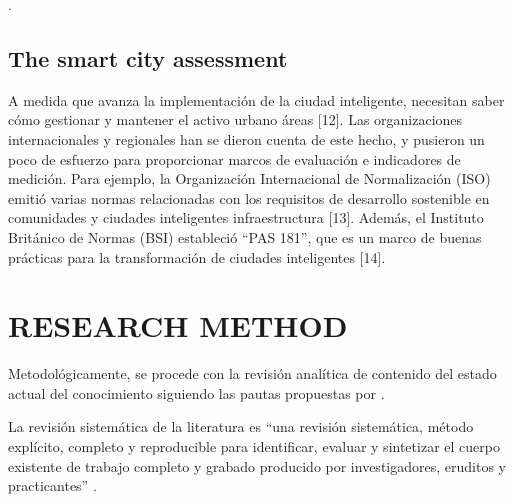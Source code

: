 \documentclass[a4paper,fleqn,spanish]{cas-dc}
\begin{document}
\cite{wahab_systematic_2020}.

\subsection{The smart city assessment}\label{afirmacion}

A medida que avanza la implementación de la ciudad inteligente, necesitan saber
cómo gestionar y mantener el activo urbano áreas [12]. Las organizaciones
internacionales y regionales han se dieron cuenta de este hecho, y pusieron un
poco de esfuerzo para proporcionar marcos de evaluación e indicadores de
medición. Para ejemplo, la Organización Internacional de Normalización (ISO)
emitió varias normas relacionadas con los requisitos de desarrollo sostenible en
comunidades y ciudades inteligentes infraestructura [13]. Además, el Instituto
Británico de Normas (BSI) estableció “PAS 181”, que es un marco de buenas
prácticas para la transformación de ciudades inteligentes [14].
\cite{aljowder_systematic_2019}



\section{RESEARCH METHOD}\label{metodo}

Metodológicamente, se procede con la revisión analítica de contenido del estado
actual del conocimiento \cite{kitchenham_guidelines_2007,
webster_analyzing_2002} siguiendo las pautas propuestas por \cite{Wolfswinkel2017}.

La revisión sistemática de la literatura es “una revisión sistemática, método
explícito, completo y reproducible para identificar, evaluar y sintetizar el
cuerpo existente de trabajo completo y grabado producido por investigadores,
eruditos y practicantes” \cite{Okoli2015}.
\end{document}
